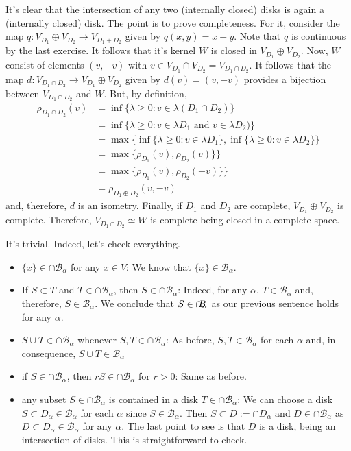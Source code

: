 \begin{solution}
It's clear that the intersection of any two (internally closed) disks is again a (internally closed) disk. The point is to prove completeness. For it, consider the map $q:V_{
D_1}\oplus V_{D_2} \to V_{D_1+D_2}$ given by $q(x,y)=x+y$. Note that $q$ is continuous by the last exercise. It follows that it's kernel $W$ is closed in $V_{D_1}\oplus V_{D_2}$. Now, $W$ consist of elements $(v,-v)$ with $v\in V_{D_1}\cap V_{D_2} = V_{D_1\cap D_2}$. It follows that the map $d:V_{D_1\cap D_2}\to V_{D_1}\oplus V_{D_2}$ given by $d(v)=(v,-v)$ provides a bijection between $V_{D_1\cap D_2}$ and $W$. But, by definition,
\begin{align*}
    \rho_{D_1\cap D_2}(v)&=\inf\{\lambda \geq 0:v \in \lambda (D_1\cap D_2) \}\\
    &= \inf\{\lambda \geq 0:v \in \lambda D_1\text{ and }v\in\lambda D_2) \}\\
    &= \max\{\inf\{\lambda \geq 0:v \in \lambda D_1\},\inf\{\lambda \geq 0:v \in \lambda D_2 \}\}\\
    &= \max\{\rho_{D_1}(v),\rho_{D_2}(v)\}\}\\
    &= \max\{\rho_{D_1}(v),\rho_{D_2}(-v)\}\}\\
    &= \rho_{D_1\oplus D_2}(v,-v)
\end{align*}
and, therefore, $d$ is an isometry. Finally, if $D_1$ and $D_2$ are complete, $V_{D_1}\oplus V_{D_2}$ is complete. Therefore, $V_{D_1\cap D_2}\simeq W$ is complete being closed in a complete space.
\end{solution} 

\begin{solution}
    It's trivial. Indeed, let's check everything.
    \begin{itemize}
        \item $\{x\}\in \cap \mathcal{B}_\alpha$ for any $x\in V$: We know that $\{x\}\in \mathcal{B}_\alpha$.
        \item If $S\subset T$ and $T\in \cap \mathcal{B}_\alpha$, then $S\in \cap \mathcal{B}_\alpha$: Indeed, for any $\alpha$, $T\in \mathcal{B}_\alpha$ and, therefore, $S\in \mathcal{B}_\alpha$. We conclude that $S\in\cap\mathclap{B}_\alpha$ as our previous sentence holds for any $\alpha$.
        \item $S\cup T\in\cap\mathcal{B}_\alpha$ whenever $S,T\in\cap\mathcal{B}_\alpha$: As before, $S,T\in \mathcal{B}_\alpha$ for each $\alpha$ and, in consequence, $S\cup T\in \mathcal{B}_\alpha$
        \item if $S\in\cap\mathcal{B}_\alpha$, then $rS\in\cap\mathcal{B}_\alpha$ for $r>0$: Same as before.
        \item any subset $S\in \cap\mathcal{B}_\alpha$ is contained in a disk $T\in \cap\mathcal{B}_\alpha$: We can choose a disk $S\subset D_\alpha\in \mathcal{B}_\alpha$ for each $\alpha$ since $S\in \mathcal{B}_\alpha$. Then $S\subset D:=\cap D_\alpha$ and $D\in \cap\mathcal{B}_\alpha$ as $D\subset D_\alpha\in \mathcal{B}_\alpha$ for any $\alpha$. The last point to see is that $D$ is a disk, being an intersection of disks. This is straightforward to check.  
    \end{itemize}
\end{solution}

